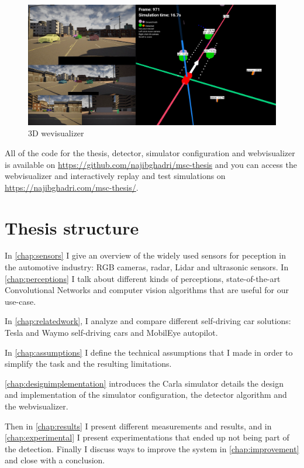 \begin{figure}[!ht]
    \centering
    \includegraphics[width=150mm, keepaspectratio]{figures/webviz2.png}
    \caption{3D wevisualizer}
    \label{fig:webviz1}
\end{figure}

All of the code for the thesis, detector, simulator configuration and
webvisualizer is available on \url{https://github.com/najibghadri/msc-thesis}
and you can access the webvisualizer and interactively replay and test
simulations on \url{https://najibghadri.com/msc-thesis/}.


\section{Thesis structure}

In \autoref{chap:sensors} I give an overview of the widely used sensors for
peception in the automotive industry: RGB cameras, radar, Lidar and ultrasonic
sensors. In \autoref{chap:perceptions} I talk about different kinds of
perceptions, state-of-the-art Convolutional Networks and computer vision
algorithms that are useful for our use-case.

In \autoref{chap:relatedwork}, I analyze and compare different self-driving  car
solutions: Tesla and Waymo self-driving cars and MobilEye autopilot.

In \autoref{chap:assumptions} I define the technical assumptions that I made in
order to simplify the task and the resulting limitations.

\autoref{chap:designimplementation} introduces the Carla simulator details the
design and implementation of the simulator configuration, the detector algorithm
and the webvisualizer.

Then in \autoref{chap:results} I present different measurements and results, and
in \autoref{chap:experimental} I present experimentations that ended up not
being part of the detection. Finally I discuss ways to improve the system in
\autoref{chap:improvement} and close with a conclusion.